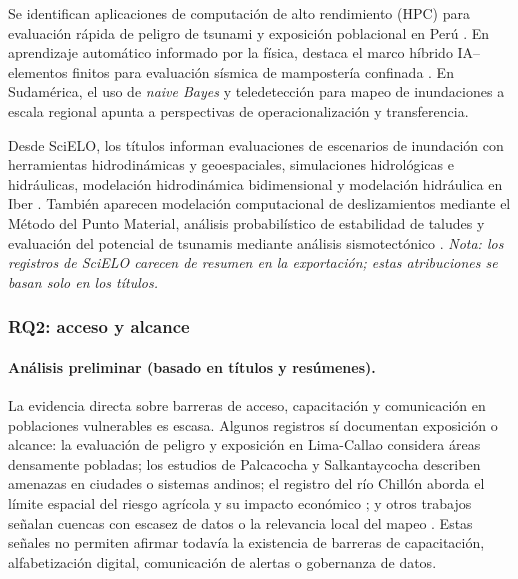 \documentclass[12pt,a4paper]{article}
\begin{document}
Se identifican aplicaciones de computación de alto rendimiento (HPC) para evaluación rápida de peligro de tsunami y exposición poblacional en Perú \parencite{garcia2025parallel}. En aprendizaje automático informado por la física, destaca el marco híbrido IA--elementos finitos para evaluación sísmica de mampostería confinada \parencite{yupanqui2025hybrid}. En Sudamérica, el uso de \textit{naive Bayes} y teledetección para mapeo de inundaciones a escala regional \parencite{kuchinski2025regional} apunta a perspectivas de operacionalización y transferencia. 

Desde SciELO, los títulos informan evaluaciones de escenarios de inundación con herramientas hidrodinámicas y geoespaciales, simulaciones hidrológicas e hidráulicas, modelación hidrodinámica bidimensional y modelación hidráulica en Iber \parencite{snchezpineda2025evaluaci, rojasguerrero2025lisis, la2025modelizaci, gutirrezgarca2022modelaci}. También aparecen modelación computacional de deslizamientos mediante el Método del Punto Material, análisis probabilístico de estabilidad de taludes y evaluación del potencial de tsunamis mediante análisis sismotectónico \parencite{lemus2024modelaci, ariasvalencia2024lisis, zamora2021evaluaci}. \textit{Nota: los registros de SciELO carecen de resumen en la exportación; estas atribuciones se basan solo en los títulos.}

\subsubsection{RQ2: acceso y alcance}
\label{sec:rq2}
\paragraph*{Análisis preliminar (basado en títulos y resúmenes).}
La evidencia directa sobre barreras de acceso, capacitación y comunicación en poblaciones vulnerables es escasa. Algunos registros sí documentan exposición o alcance: la evaluación de peligro y exposición en Lima-Callao \parencite{quesquen2025tsunami, androsov2024nonlinear, garcia2025parallel} considera áreas densamente pobladas; los estudios de Palcacocha y Salkantaycocha \parencite{stuartsmith2021increased, vilca2021glacial} describen amenazas en ciudades o sistemas andinos; el registro del río Chillón aborda el límite espacial del riesgo agrícola y su impacto económico \parencite{lpezsilva2025spatial}; y otros trabajos señalan cuencas con escasez de datos o la relevancia local del mapeo \parencite{marin2021assessing, kuchinski2025regional}. Estas señales no permiten afirmar todavía la existencia de barreras de capacitación, alfabetización digital, comunicación de alertas o gobernanza de datos.
\end{document}
